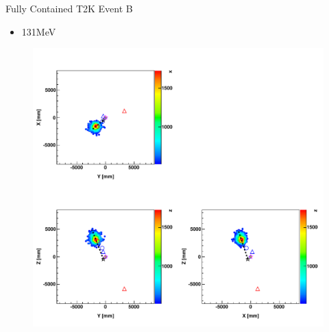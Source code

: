 \documentclass{beamer} %
\begin{document}
\begin{frame}{Fully Contained T2K Event B}
	\begin{itemize}
		\item 131MeV
	\end{itemize}
	\begin{figure}
		\includegraphics[width=\textwidth,height=0.9\textheight,keepaspectratio]
			{material/fom_map__run11317_evt8187014.pdf}
	\end{figure}
\end{frame}
\end{document}

